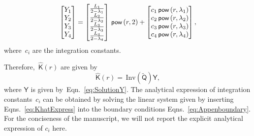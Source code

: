 \documentclass[preprint,12pt,times]{elsarticle}
\numberwithin{equation}{section}
\renewcommand{\u}[1]{\boldsymbol{#1}}
\newcommand{\usf}[1]{\u{\mathsf #1}}
\newcommand{\pr}[1]{\left( #1 \right)}
\newcommand{\p}{\,\textsf{\small pow}}
\newcommand{\Inv}{\,\mathrm{Inv}}
\renewcommand{\>}{$\Rightarrow$}
\begin{document}
\begin{equation}
	\begin{bmatrix}
	 Y_{1} \\ Y_{2} \\ Y_{3} \\ Y_{4}
	\end{bmatrix}
	=
	\begin{bmatrix}
	 \frac{L_{1}}{2-\lambda_{1}} \\ \frac{L_{2}}{2-\lambda_{2}} \\ \frac{L_{3}}{2-\lambda_{3}} \\ \frac{L_{4}}{2-\lambda_{4}}
	\end{bmatrix}\p\pr{r,2}
	+
	\begin{bmatrix}
	 c_{1} \p\pr{r,\lambda_{1}} \\ c_{2} \p\pr{r,\lambda_{2}} \\ c_{3} \p\pr{r,\lambda_{3}} \\ c_{4} \p\pr{r,\lambda_{4}}
	\end{bmatrix},
  \label{eq:SolutionY}
\end{equation}
where~$c_{i}$ are the integration constants.

Therefore,~$\hat{\usf{K}}(r)$ are given by
\begin{equation}
\hat{\usf{K}}(r)  = \Inv\left( \tilde{\usf{Q}} \right)\usf{Y},
\label{eq:KhatExpress}
\end{equation}
where $\usf{Y}$ is given by~Eqn.~\eqref{eq:SolutionY}.
The analytical expression of integration constants~$c_{i}$ can be obtained by solving the linear system given by inserting Eqns.~\eqref{eq:KhatExpress} into the boundary conditions Eqns.~\eqref{eq:Appenboundary}. For the conciseness of the manuscript, we will not report the explicit analytical expression of $c_{i}$ here.
\end{document}
